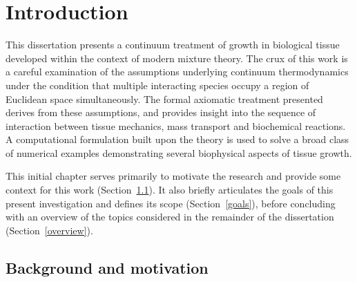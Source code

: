 \chapter{Introduction}
\label{introduction}


This dissertation presents a continuum treatment of growth in
biological tissue developed within the context of modern mixture
theory. The crux of this work is a careful examination of the
assumptions underlying continuum thermodynamics under the condition
that multiple interacting species occupy a region of Euclidean space
simultaneously. The formal axiomatic treatment presented derives from
these assumptions, and provides insight into the sequence of
interaction between tissue mechanics, mass transport and biochemical
reactions. A computational formulation built upon the theory is used
to solve a broad class of numerical examples demonstrating several
biophysical aspects of tissue growth.

This initial chapter serves primarily to motivate the research and
provide some context for this work (Section~\ref{background}). It also
briefly articulates the goals of this present investigation and
defines its scope (Section~\ref{goals}), before concluding with an
overview of the topics considered in the remainder of the dissertation
(Section~\ref{overview}).

\section{Background and motivation}
\label{background}

